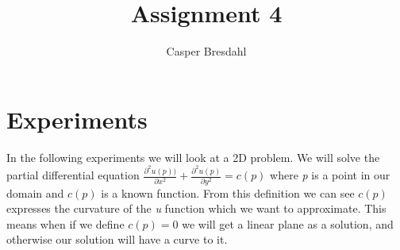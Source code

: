 \documentclass[acmtog]{acmart}
\begin{document}
	
	\title{Assignment 4}
	
	
	\author{Casper Bresdahl}
	
	
	
	\maketitle
	
	
	
	\section{Experiments}
	In the following experiments we will look at a 2D problem. We will solve the partial differential equation $\frac{\partial^2 u(p))}{\partial x^2} + \frac{\partial^2 u(p)}{\partial y^2} = c(p)$ where \textit{p} is a point in our domain and $c(p)$ is a known function. From this definition we can see $c(p)$ expresses the curvature of the \textit{u} function which we want to approximate. This means when if we define $c(p) = 0$ we will get a linear plane as a solution, and otherwise our solution will have a curve to it. 
	
	
	
	\newpage


	
\end{document}
